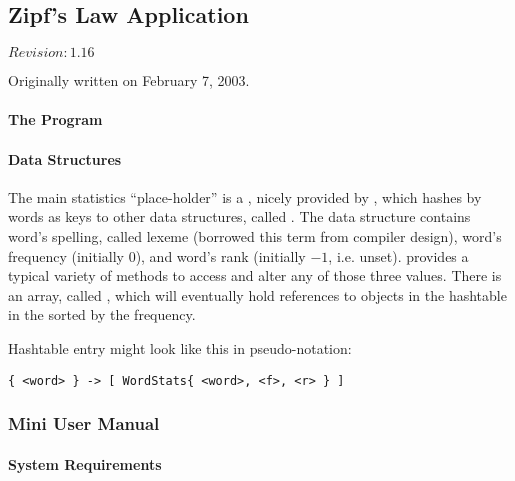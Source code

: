 \subsection{Zipf's Law Application}
\label{sect:zipf-law-app}

$Revision: 1.16 $

Originally written on February 7, 2003.

\paragraph{The Program}


\paragraph{Data Structures}

The main statistics ``place-holder'' is a  , nicely
provided by {\java}, which hashes by words as keys to other
data structures, called . The  data structure
contains word's spelling, called lexeme (borrowed this term
from compiler design), word's frequency (initially $0$), and
word's rank (initially $-1$, i.e. unset).  provides a typical
variety of methods to access and alter any of those three values.
There is an array, called , which will eventually
hold references to  objects in the  hashtable in
the sorted by the frequency.

Hashtable entry might look like this in pseudo-notation:

\verb+{ <word> } -> [ WordStats{ <word>, <f>, <r> } ]+

\subsubsection{Mini User Manual}

\paragraph{System Requirements}

